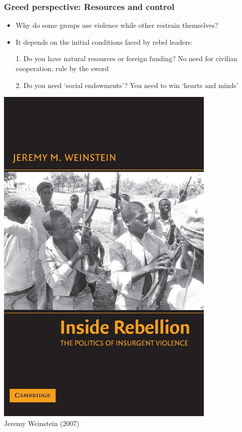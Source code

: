 \documentclass[utf8, xcolor=dvipsnames]{beamer}
\begin{document}
\begin{frame}
\frametitle{Greed perspective: Resources and control}
\centering

\begin{minipage}{0.6\textwidth}\centering
  \begin{itemize}[<+->]
    \item Why do some groups use violence while other restrain themselves?
    \item It depends on the initial conditions faced by rebel leaders:
    \item[1.] Do you have natural resources or foreign funding? No need for civilian cooperation, rule by the sword
    \item[2.] Do you need `social endowments'? You need to win `hearts and minds'
  \end{itemize}
\end{minipage}\hfill
\begin{minipage}{0.39\textwidth}\centering
\includegraphics[width = 0.8\textwidth]{img/weinstein2007}\\
{\small Jeremy Weinstein (2007)}
\end{minipage}

\end{frame}
\end{document}
